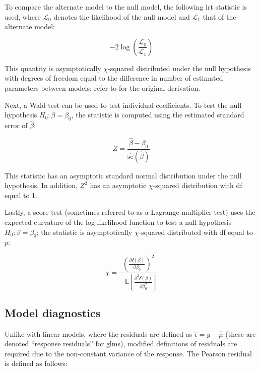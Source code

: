 \documentclass{report}
\begin{document}
To compare the alternate model to the null model, the following \gls{lrt} statistic is used, where $\mathcal{L}_0$ denotes the likelihood of the null model and $\mathcal{L}_1$ that of the alternate model:

\begin{equation}\label{eq:glm-lrt-statistic-nested}
    -2\log\left(\frac{\mathcal{L}_0}{\mathcal{L}_1}\right)
\end{equation}

This quantity is asymptotically $\chi$-squared distributed under the null hypothesis with degrees of freedom equal to the difference in number of estimated parameters between models; refer to \cite{wilks_large-sample_1938} for the original derivation. 

Next, a Wald test can be used to test individual coefficients. To test the null hypothesis $H_0: \beta = \beta_0$, the statistic is computed using the estimated standard error of $\hat{\beta}$:

\begin{equation}\label{eq:glm-z-statistic}
    Z = \frac{\hat{\beta} - \beta_0}{\widehat{\text{se}}\left(\hat{\beta}\right)}
\end{equation}

This statistic has an asymptotic standard normal distribution under the null hypothesis. In addition, $Z^2$ has an asymptotic $\chi$-squared distribution with \gls{df} equal to 1. 

Lastly, a score test (sometimes referred to as a Lagrange multiplier test) uses the expected curvature of the log-likelihood function to test a null hypothesis $H_0: \beta = \beta_0$; the statistic is asymptotically $\chi$-squared distributed with \gls{df} equal to $p$:

\begin{equation}\label{eq:glm-score-statistic}
    \chi = \frac{\left(\frac{\partial\mathcal{l}(\beta)}{\partial\beta_0}\right)^2}{-\mathbb{E}\left[\frac{\partial^2\mathcal{l}(\beta)}{\partial\beta_0^2}\right]}
\end{equation}

\subsection{Model diagnostics}

Unlike with linear models, where the residuals are defined as $\hat{\epsilon} = y - \hat{\mu}$ (these are denoted ``response residuals'' for \glspl{glm}), modified definitions of residuals are required due to the non-constant variance of the response. The Pearson residual is defined as follows:
\end{document}

